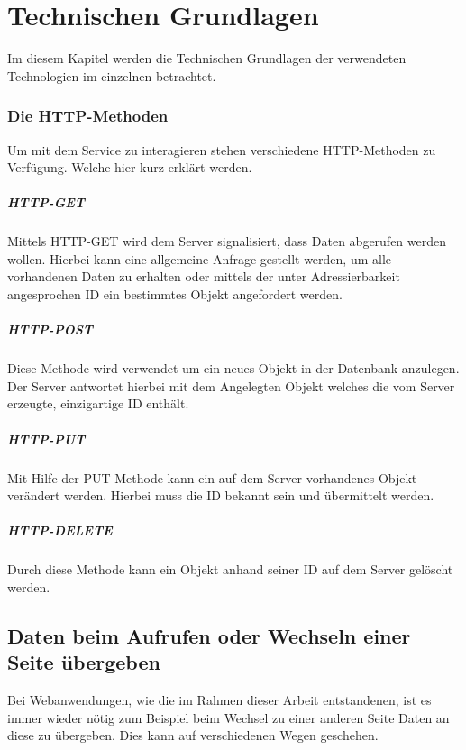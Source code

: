 

\chapter{Technischen Grundlagen} \label{Theoretische Grundlagen}
Im diesem Kapitel werden die Technischen Grundlagen der verwendeten Technologien im einzelnen betrachtet.

\subsection{Die HTTP-Methoden}
Um mit dem Service zu interagieren stehen verschiedene HTTP-Methoden zu Verfügung. Welche hier kurz erklärt werden.
\paragraph{HTTP-GET}
Mittels HTTP-GET wird dem Server signalisiert, dass Daten abgerufen werden wollen. Hierbei kann eine allgemeine Anfrage gestellt werden, um alle vorhandenen Daten zu erhalten oder mittels der unter Adressierbarkeit angesprochen ID ein bestimmtes Objekt angefordert werden.
\paragraph{HTTP-POST}
Diese Methode wird verwendet um ein neues Objekt in der Datenbank anzulegen. Der Server antwortet hierbei mit dem Angelegten Objekt welches die vom Server erzeugte, einzigartige ID enthält.
\paragraph{HTTP-PUT}
Mit Hilfe der PUT-Methode kann ein auf dem Server vorhandenes Objekt verändert werden. Hierbei muss die ID bekannt sein und übermittelt werden.
\paragraph{HTTP-DELETE}
Durch diese Methode kann ein Objekt anhand seiner ID auf dem Server gelöscht werden.

\section{Daten beim Aufrufen oder Wechseln einer Seite übergeben}
Bei Webanwendungen, wie die im Rahmen dieser Arbeit entstandenen, ist es immer wieder nötig zum Beispiel beim Wechsel zu einer anderen Seite Daten an diese zu übergeben. Dies kann auf verschiedenen Wegen geschehen.

